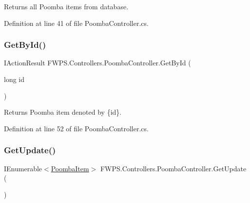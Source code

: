 Returns all Poomba items from database. 



Definition at line 41 of file Poomba\+Controller.\+cs.

\mbox{\label{class_f_w_p_s_1_1_controllers_1_1_poomba_controller_a8974ce80e3e49cdbc98d58135e7b3780}} 
\subsubsection{\texorpdfstring{Get\+By\+Id()}{GetById()}}
{\footnotesize\ttfamily I\+Action\+Result F\+W\+P\+S.\+Controllers.\+Poomba\+Controller.\+Get\+By\+Id (\begin{DoxyParamCaption}\item[{long}]{id }\end{DoxyParamCaption})}



Returns Poomba item denoted by \{id\}. 



Definition at line 52 of file Poomba\+Controller.\+cs.

\mbox{\label{class_f_w_p_s_1_1_controllers_1_1_poomba_controller_adfc9eb5cb3b835aa5dcba35d982f5612}} 
\subsubsection{\texorpdfstring{Get\+Update()}{GetUpdate()}}
{\footnotesize\ttfamily I\+Enumerable$<$\mbox{\hyperlink{class_f_w_p_s_1_1_models_1_1_poomba_item}{Poomba\+Item}}$>$ F\+W\+P\+S.\+Controllers.\+Poomba\+Controller.\+Get\+Update (\begin{DoxyParamCaption}{ }\end{DoxyParamCaption})}



